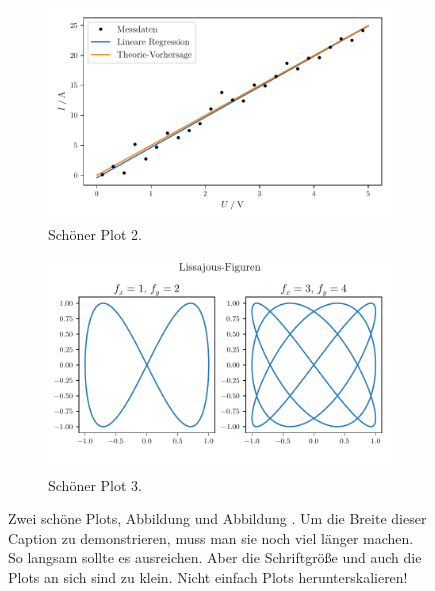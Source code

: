 \documentclass{scrartcl}
\begin{document}
\begin{figure}%
  \begin{subfigure}{0.475\textwidth}%
    \includegraphics[width=\textwidth]{plot2.pdf}%
    \caption{Schöner Plot 2.}%
    \label{fig:plot2}%
  \end{subfigure}%
  \hfill%
  \begin{subfigure}{0.475\textwidth}%
    \centering%
    \includegraphics[width=\textwidth]{plot3.pdf}%
    \caption{Schöner Plot 3.}%
    \label{fig:plot3}%
  \end{subfigure}%
  \caption{%
    Zwei schöne Plots, Abbildung  und Abbildung .
    Um die Breite dieser Caption zu demonstrieren, muss man sie noch viel länger machen. 
    So langsam sollte es ausreichen.
    Aber die Schriftgröße und auch die Plots an sich sind zu klein.
    Nicht einfach Plots herunterskalieren!
  }\label{fig:subfigs}%
\end{figure}
\end{document}
